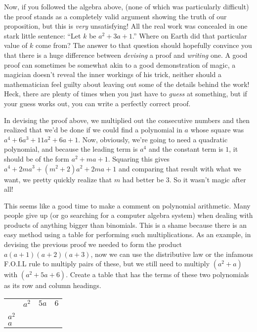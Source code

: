 \documentclass[10pt,]{book}
\theoremstyle{plain}
\theoremstyle{definition}
\theoremstyle{definition}
\numberwithin{equation}{section}
\newcommand{\hrulethin}  {\noalign{\hrule height 0.04em}}
\begin{document}
    Now, if you followed the algebra above, (none of which was particularly
    difficult) the proof stands as a completely valid argument showing the
    truth of our proposition, but this is \emph{very} unsatisfying! All
    the real work was concealed in one stark little sentence:
    ``Let \(k\) be \(a^2+3a+1\).'' Where on Earth did that particular value
    of \(k\) come from? The answer to that question should hopefully
    convince you that there is a huge difference between \emph{devising}
    a proof and \emph{writing} one. A good proof can sometimes be
    somewhat akin to a good demonstration of magic, a magician doesn't
    reveal the inner workings of his trick, neither should a mathematician
    feel guilty about leaving out some of the details behind the work!
    Heck, there are plenty of times when you just have to \emph{guess}
    at something, but if your guess works out, you can write
    a perfectly correct proof.
\par

    In devising the proof above, we multiplied out the consecutive numbers
    and then realized that we'd be done if we could find a polynomial in
    \(a\) whose square was \(a^4  + 6a^3 + 11a^2 + 6a + 1\). Now, obviously,
    we're going to need a quadratic polynomial, and because the leading
    term is \(a^4\) and the constant term is \(1\), it should be of the form
    \(a^2 + ma + 1\). Squaring this gives \(a^4 + 2ma^3 + (m^2+2)a^2 + 2ma + 1\)
    and comparing that result with what we want, we pretty quickly realize
    that \(m\) had better be 3. So it wasn't magic after all!
\par

    This seems like a good time to make a comment on polynomial arithmetic.
    Many people give up (or go searching for a computer algebra system)
    when dealing with products of anything bigger than binomials. This
    is a shame because there is an easy method using a table for performing
    such multiplications. As an example, in devising the previous proof we
    needed to form the product \(a(a+1)(a+2)(a+3)\), now we can use the
    distributive law or the infamous F.O.I.L rule to multiply pairs of these,
    but we still need to multiply \((a^2+a)\) with \((a^2+5a+6)\). Create a
    table that has the terms of these two polynomials as its row and column
    headings.
\begin{tabular}{llll}
&\(a^2\)&\(5a\)&\(6\)\tabularnewline[0pt]
&&&\tabularnewline\hrulethin
\(a^2\)&&&\tabularnewline[0pt]
\(a\)&&&
\end{tabular}
\par
\end{document}
